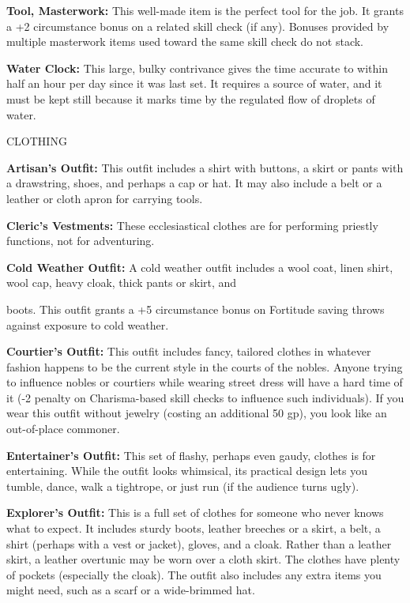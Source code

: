 \documentclass{article}
\begin{document}
\textbf{Tool, Masterwork:} This well-made item is the perfect tool for the job. 
It grants a +2 circumstance bonus on a related skill check (if any). Bonuses provided 
by multiple masterwork items used toward the same skill check do not stack.

\textbf{Water Clock: }This large, bulky contrivance gives the time accurate to 
within half an hour per day since it was last set. It requires a source of water, 
and it must be kept still because it marks time by the regulated flow of droplets 
of water.

\vspace{12pt}
CLOTHING

\textbf{Artisan's Outfit: }This outfit includes a shirt with buttons, a skirt or 
pants with a drawstring, shoes, and perhaps a cap or hat. It may also include a 
belt or a leather or cloth apron for carrying tools.

\textbf{Cleric's Vestments: }These ecclesiastical clothes are for performing priestly 
functions, not for adventuring.

\textbf{Cold Weather Outfit:} A cold weather outfit includes a wool coat, linen 
shirt, wool cap, heavy cloak, thick pants or skirt, and

boots. This outfit grants a +5 circumstance bonus on Fortitude saving throws against 
exposure to cold weather.

\textbf{Courtier's Outfit:} This outfit includes fancy, tailored clothes in whatever 
fashion happens to be the current style in the courts of the nobles. Anyone trying 
to influence nobles or courtiers while wearing street dress will have a hard time 
of it (-2 penalty on Charisma-based skill checks to influence such individuals). 
If you wear this outfit without jewelry (costing an additional 50 gp), you look 
like an out-of-place commoner.

\textbf{Entertainer's Outfit:} This set of flashy, perhaps even gaudy, clothes 
is for entertaining. While the outfit looks whimsical, its practical design lets 
you tumble, dance, walk a tightrope, or just run (if the audience turns ugly).

\textbf{Explorer's Outfit:} This is a full set of clothes for someone who never 
knows what to expect. It includes sturdy boots, leather breeches or a skirt, a 
belt, a shirt (perhaps with a vest or jacket), gloves, and a cloak. Rather than 
a leather skirt, a leather overtunic may be worn over a cloth skirt. The clothes 
have plenty of pockets (especially the cloak). The outfit also includes any extra 
items you might need, such as a scarf or a wide-brimmed hat.
\end{document}
